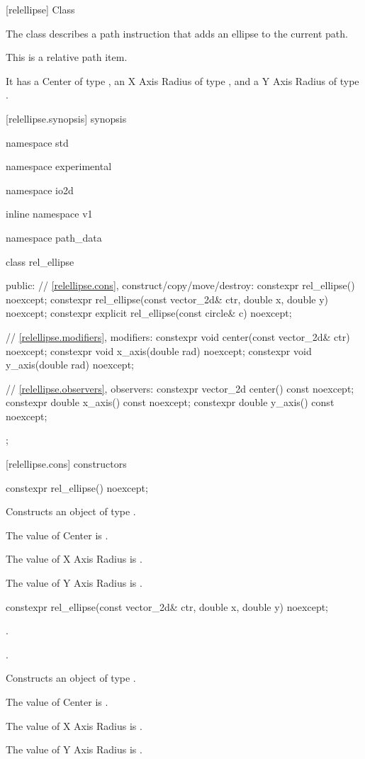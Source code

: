  [relellipse] {Class }

\pnum
{}
The class  describes a path instruction that adds an ellipse to the current path.

\pnum
This is a relative path item.

\pnum
It has a Center of type , an X Axis Radius of type , and a Y Axis Radius of type .

 [relellipse.synopsis] { synopsis}

\begin{codeblock}
namespace std { namespace experimental { namespace io2d { inline namespace v1 {
  namespace path_data {
    class rel_ellipse {
    public:
      // \ref{relellipse.cons}, construct/copy/move/destroy:
      constexpr rel_ellipse() noexcept;
      constexpr rel_ellipse(const vector_2d& ctr, double x, double y) noexcept;
      constexpr explicit rel_ellipse(const circle& c) noexcept;

      // \ref{relellipse.modifiers}, modifiers:
      constexpr void center(const vector_2d& ctr) noexcept;
      constexpr void x_axis(double rad) noexcept;
      constexpr void y_axis(double rad) noexcept;
    
      // \ref{relellipse.observers}, observers:
      constexpr vector_2d center() const noexcept;
      constexpr double x_axis() const noexcept;
      constexpr double y_axis() const noexcept;
    };
  }
} } } }
\end{codeblock}

 [relellipse.cons] { constructors}

\begin{itemdecl}
constexpr rel_ellipse() noexcept;
\end{itemdecl}
\begin{itemdescr}
\pnum
\effects
Constructs an object of type .

\pnum
The value of Center is .

\pnum
The value of X Axis Radius is .

\pnum
The value of Y Axis Radius is .
\end{itemdescr}

\begin{itemdecl}
constexpr rel_ellipse(const vector_2d& ctr, double x, double y) noexcept;
\end{itemdecl}
\begin{itemdescr}
\pnum
\requires
{}.

\pnum
{}.

\pnum
\effects
Constructs an object of type .

\pnum
The value of Center is .

\pnum
The value of X Axis Radius is .

\pnum
The value of Y Axis Radius is .
\end{itemdescr}


